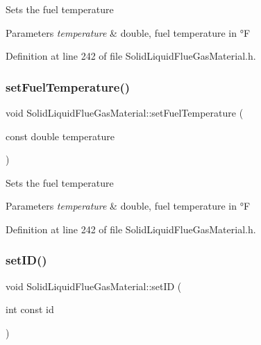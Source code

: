 Sets the fuel temperature 
\begin{DoxyParams}{Parameters}
{\em temperature} & double, fuel temperature in °F \\
\hline
\end{DoxyParams}


Definition at line 242 of file Solid\+Liquid\+Flue\+Gas\+Material.\+h.

\mbox{\label{class_solid_liquid_flue_gas_material_a420ba1234c5f8c4b93f190b61046a589}} 
\subsubsection{\texorpdfstring{set\+Fuel\+Temperature()}{setFuelTemperature()}\hspace{0.1cm}{\footnotesize\ttfamily [3/3]}}
{\footnotesize\ttfamily void Solid\+Liquid\+Flue\+Gas\+Material\+::set\+Fuel\+Temperature (\begin{DoxyParamCaption}\item[{const double}]{temperature }\end{DoxyParamCaption})\hspace{0.3cm}{\ttfamily [inline]}}

Sets the fuel temperature 
\begin{DoxyParams}{Parameters}
{\em temperature} & double, fuel temperature in °F \\
\hline
\end{DoxyParams}


Definition at line 242 of file Solid\+Liquid\+Flue\+Gas\+Material.\+h.

\mbox{\label{class_solid_liquid_flue_gas_material_a6046d06703bd496745121b62eab4f40f}} 
\subsubsection{\texorpdfstring{set\+I\+D()}{setID()}\hspace{0.1cm}{\footnotesize\ttfamily [1/3]}}
{\footnotesize\ttfamily void Solid\+Liquid\+Flue\+Gas\+Material\+::set\+ID (\begin{DoxyParamCaption}\item[{int const}]{id }\end{DoxyParamCaption})\hspace{0.3cm}{\ttfamily [inline]}}

